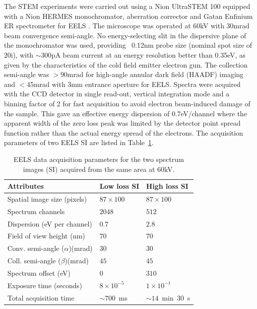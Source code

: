 \documentclass[%
aip,
rsi,%
 amsmath,amssymb,%
 reprint,%
]{revtex4-1}
\begin{document}
The STEM experiments were carried out using a Nion UltraSTEM 100 equipped with a Nion HERMES monochromator, aberration corrector and Gatan Enfinium ER spectrometer for EELS \cite{Krivanek2013,Krivanek2015}. The microscope was operated at 60kV with 30mrad beam convergence semi-angle. No energy-selecting slit in the dispersive plane of the monochromator was used, providing  ~0.12nm probe size (nominal spot size of 20i), with $\sim$300pA beam current at an energy resolution better than 0.35eV, as given by the characteristics of the cold field emitter electron gun. The collection semi-angle was $>$90mrad for high-angle annular dark field (HAADF) imaging and $<$45mrad with 3mm entrance aperture for EELS. Spectra were acquired with the CCD detector in single read-out, vertical integration mode and a binning factor of 2 for fast acquisition to avoid electron beam-induced damage of the sample. This gave an effective energy dispersion of 0.7eV/channel where the apparent width of the zero loss peak was limited by the detector point spread function rather than the actual energy spread of the electrons. The acquisition parameters of two EELS SI are listed in Table~\ref{tab:Attributes}.
\begin{table}%
	\caption{EELS data acquisition parameters for the two spectrum images (SI) acquired from the same area at $60$kV.}
    \label{tab:Attributes}
	\begin{ruledtabular}
		\begin{tabular}{lll}
			Attributes&Low loss SI&High loss SI							\\ \hline
			Spatial image size (pixels)&$87\times100$&$87\times100$ 	\\
            Spectrum channels		&$2048$&$512$						\\
			Dispersion (eV per channel)&$0.7$&$2.8$						\\
			Field of view height (nm) &$70$&$70$						\\
			Conv. semi-angle ($\alpha$)(mrad)&$30$&$30$					\\
			Coll. semi-angle ($\beta$)(mrad)&$45$&$45$					\\
			Spectrum offset (eV)&$0$&$310$								\\
			Exposure time (seconds)&$8\times10^{-5}$&$1\times10^{-1}$	\\
			Total acquisition time &$\sim700$~ms&$\sim14$~min~$30$~s
		\end{tabular}
	\end{ruledtabular}
\end{table}
\end{document}
